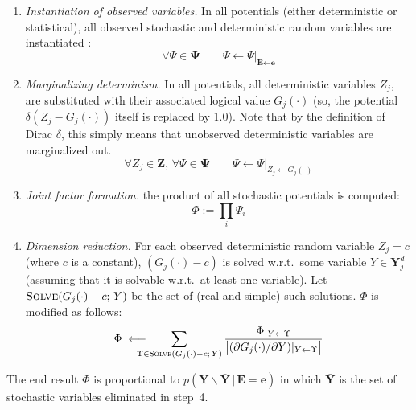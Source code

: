 \documentclass{article}
\newcommand{\bvec}[1]{\textbf{#1}}
\newcommand{\pr}{p}
\begin{document}

\begin{enumerate}
\item \emph{Instantiation of observed variables.} 
In all potentials (either deterministic or statistical), all observed stochastic and deterministic random variables are instantiated
:
\begin{equation*}
\forall \Psi \in \boldsymbol{\Psi} \qquad \Psi \leftarrow \Psi|_{\bvec{E} \leftarrow \bvec{e}}
\end{equation*} 
\item 
\emph{Marginalizing determinism.} 
In all potentials, all deterministic variables $Z_j$, are 
substituted with their associated logical value $G_j(\cdot)$ (so, the potential $\delta ( Z_j - G_j(\cdot) )$ itself is replaced by 1.0). Note that by the definition of Dirac $\delta$, this simply means that  unobserved deterministic variables are marginalized out.
\begin{equation*}
\forall Z_j \in \bvec{Z},\,
\forall \Psi \in \boldsymbol{\Psi} 
\qquad
\Psi \leftarrow \Psi|_{Z_j \leftarrow G_j (\cdot)}
\end{equation*}
\item \emph{Joint factor formation.} the product of all stochastic potentials is computed: 
\begin{equation*}
\Phi := \prod_{i} \Psi_i
\end{equation*}
%
\item \emph{Dimension reduction.} %
For each observed deterministic random variable $Z_j = c$ (where $c$ is a constant),
$(G_j(\cdot) - c)$ is solved w.r.t.\ some variable 
$Y  \in \bvec{Y}_j^d$ (assuming that it is solvable %
w.r.t.\ at least one variable).
Let  
$\textsc{Solve}(G_j(\cdot) - c; \, Y)$
be the set of (real and simple) such solutions.
$\Phi$ is modified as follows:
\begin{equation}
\label{e:core}
\Phi 
\;
\longleftarrow
\!\!\!\!\!\!\!
\sum_{\Upsilon \in \textsc{Solve}(G_j(\cdot) - c;\, Y)}
\frac{\Phi|_{Y \leftarrow \Upsilon}}{
\big|(\partial G_j(\cdot) / \partial Y) |_{Y \leftarrow \Upsilon}
\big|
}
\end{equation}
\end{enumerate}
The end result $\Phi$ is proportional to 
$\pr(\bvec{Y}\backslash \bar{\bvec{Y}} \,|\, \bvec{E} = \bvec{e})$ in which 
$\bar{\bvec{Y}}$ is the set of stochastic variables eliminated in
step~4.
\end{document}
